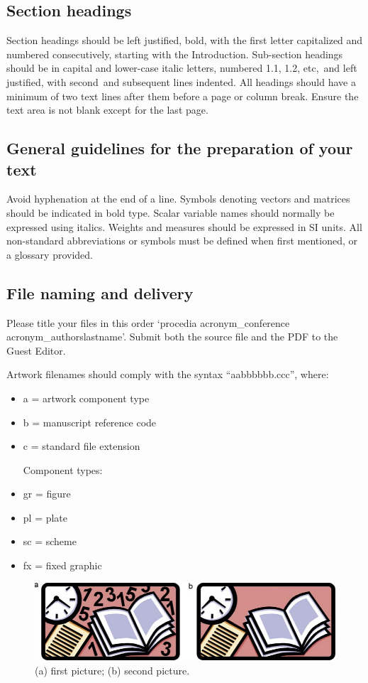 \documentclass[5p,times,procedia]{elsarticle}
\begin{document}
\subsection{Section headings}
Section headings should be left justified, bold, with the first letter capitalized and numbered consecutively, starting with the Introduction. Sub-section headings should be in capital and lower-case italic letters, numbered 1.1, 1.2, etc,~and left justified, with second~and subsequent lines indented. All headings should have a minimum of two text lines after them before a page or column break.
Ensure the text area is not blank except for the last page.

\subsection{General guidelines for the preparation of your text}
Avoid hyphenation at the end of a line. Symbols denoting vectors and matrices should be indicated in bold type. Scalar variable names should normally be expressed using italics. Weights and measures should be expressed in SI units. All non-standard abbreviations or symbols must be defined when first mentioned, or a glossary provided.

\subsection{File naming and delivery}
Please title your files in this order `procedia acronym\_conference acronym\_authorslastname'.  Submit both the source file and the PDF to the Guest Editor.

Artwork filenames should comply with the syntax ``aabbbbbb.ccc'', where:
\begin{itemize}
\item a = artwork component type
\item b = manuscript reference code
\item c = standard file extension

Component types:
\item gr = figure
\item pl = plate
\item sc = scheme
\item fx = fixed graphic
\end{itemize}

\begin{figure}[t]\vspace*{4pt}
\centerline{\includegraphics{./img/gr1}}
\caption{(a) first picture; (b) second picture.}
\end{figure}
\end{document}
